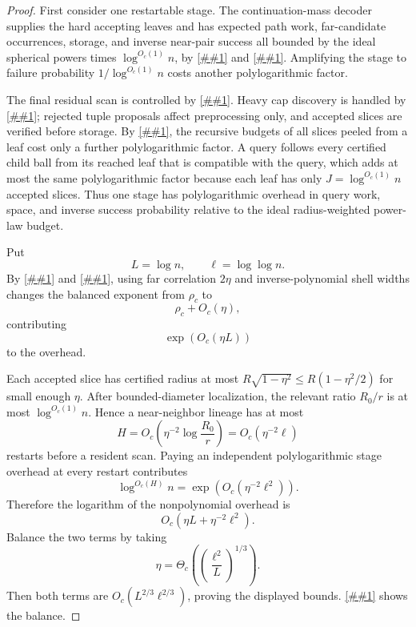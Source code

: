 \documentclass[10pt]{article}
\newcommand{\cref}[1]{\ref{##1}}
\newcommand{\Cref}[1]{\ref{##1}}
\theoremstyle{definition}
\begin{document}
\begin{proof}
   First consider one restartable stage. The continuation-mass decoder supplies the hard accepting leaves and has expected path work, far-candidate occurrences, storage, and inverse near-pair success all bounded by the ideal spherical powers times $\log^{O_c(1)}n$, by \cref{lem:continuation-work} and \cref{cor:spherical-survival}. Amplifying the stage to failure probability $1/\log^{O_c(1)}n$ costs another polylogarithmic factor.

   The final residual scan is controlled by \cref{lem:slice-residual}. Heavy cap discovery is handled by \cref{lem:tuple-cap-finder}; rejected tuple proposals affect preprocessing only, and accepted slices are verified before storage. By \cref{lem:slice-budget}, the recursive budgets of all slices peeled from a leaf cost only a further polylogarithmic factor. A query follows every certified child ball from its reached leaf that is compatible with the query, which adds at most the same polylogarithmic factor because each leaf has only $J=\log^{O_c(1)}n$ accepted slices. Thus one stage has polylogarithmic overhead in query work, space, and inverse success probability relative to the ideal radius-weighted power-law budget.

   Put
   \[
      L=\log n,
      \qquad
      \ell=\log\log n.
   \]
   By \cref{lem:rho-stability} and \cref{lem:shell}, using far correlation $2\eta$ and inverse-polynomial shell widths changes the balanced exponent from $\rho_c$ to
   \[
      \rho_c+O_c(\eta),
   \]
   contributing
   \[
      \exp(O_c(\eta L))
   \]
   to the overhead.

   Each accepted slice has certified radius at most $R\sqrt{1-\eta^2}\le R(1-\eta^2/2)$ for small enough $\eta$. After bounded-diameter localization, the relevant ratio $R_0/r$ is at most $\log^{O_c(1)}n$. Hence a near-neighbor lineage has at most
   \[
      H=O_c\!\left(\eta^{-2}\log\frac{R_0}{r}\right)
      =
      O_c(\eta^{-2}\ell)
   \]
   restarts before a resident scan. Paying an independent polylogarithmic stage overhead at every restart contributes
   \[
      \log^{O_c(H)}n
      =
      \exp(O_c(\eta^{-2}\ell^2)).
   \]
   Therefore the logarithm of the nonpolynomial overhead is
   \[
      O_c(\eta L+\eta^{-2}\ell^2).
   \]
   Balance the two terms by taking
   \[
      \eta=\Theta_c\!\left(\left(\frac{\ell^2}{L}\right)^{1/3}\right).
   \]
   Then both terms are $O_c(L^{2/3}\ell^{2/3})$, proving the displayed bounds. \Cref{fig:balance} shows the balance.
\end{proof}
\end{document}
